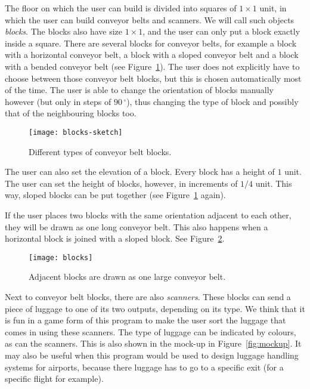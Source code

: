 The floor on which the user can build is divided into squares of $1 \times 1$ unit, in which the user can build conveyor belts and scanners. We will call such objects \textit{blocks}. The blocks also have size $1 \times 1$, and the user can only put a block exactly inside a square. There are several blocks for conveyor belts, for example a block with a horizontal conveyor belt, a block with a sloped conveyor belt and a block with a bended conveyor belt (see Figure~\ref{fig:block-types}). The user does not explicitly have to choose between those conveyor belt blocks, but this is chosen automatically most of the time. The user is able to change the orientation of blocks manually however (but only in steps of $90\,^\circ$), thus changing the type of block and possibly that of the neighbouring blocks too.

\begin{figure}
  \begin{center}
    \texttt{[image: blocks-sketch]}
    \caption{Different types of conveyor belt blocks.}
    \label{fig:block-types}
  \end{center}
\end{figure}

The user can also set the elevation of a block. Every block has a height of $1$ unit. The user can set the height of blocks, however, in increments of $1/4$ unit. This way, sloped blocks can be put together (see Figure~\ref{fig:block-types} again).

If the user places two blocks with the same orientation adjacent to each other, they will be drawn as one long conveyor belt. This also happens when a horizontal block is joined with a sloped block. See Figure~\ref{fig:blocks}.

\begin{figure}
  \begin{center}
    \texttt{[image: blocks]}
    \caption{Adjacent blocks are drawn as one large conveyor belt.}
    \label{fig:blocks}
  \end{center}
\end{figure}

Next to conveyor belt blocks, there are also \textit{scanners}. These blocks can send a piece of luggage to one of its two outputs, depending on its type. We think that it is fun in a game form of this program to make the user sort the luggage that comes in using these scanners. The type of luggage can be indicated by colours, as can the scanners. This is also shown in the mock-up in Figure~\ref{fig:mockup}. It may also be useful when this program would be used to design luggage handling systems for airports, because there luggage has to go to a specific exit (for a specific flight for example).